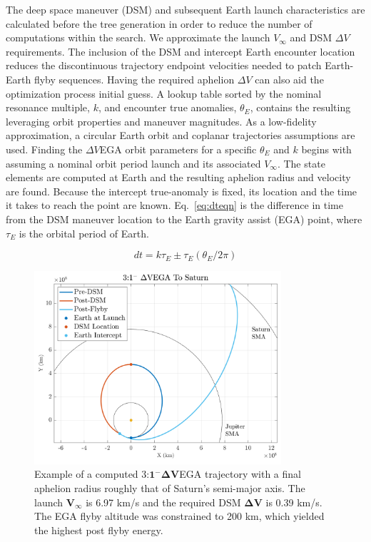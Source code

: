 \documentclass[letterpaper, paper,11pt]{AAS}	%
\begin{document}
The deep space maneuver (DSM) and subsequent Earth launch characteristics are calculated before the tree generation in order to reduce the number of computations within the search. We approximate the launch $V_\infty$ and DSM $\Delta V$ requirements. The inclusion of the DSM and intercept Earth encounter location reduces the discontinuous trajectory endpoint velocities needed to patch Earth-Earth flyby sequences. Having the required aphelion $\Delta V$ can also aid the optimization process initial guess. A lookup table sorted by the nominal resonance multiple, $k$, and encounter true anomalies, $\theta_{E}$, contains the resulting leveraging orbit properties and maneuver magnitudes. As a low-fidelity approximation, a circular Earth orbit and coplanar trajectories assumptions are used. Finding the $\Delta V$EGA orbit parameters for a specific $\theta_{E}$ and $k$ begins with assuming a nominal orbit period launch and its associated $V_\infty$. The state elements are computed at Earth and the resulting aphelion radius and velocity are found. Because the intercept true-anomaly is fixed, its location and the time it takes to reach the point are known. Eq.~\eqref{eq:dteqn} is the difference in time from the DSM maneuver location to the Earth gravity assist (EGA) point, where $\tau_E$ is the orbital period of Earth.

\begin{equation}
	\label{eq:dteqn}
	dt = k\tau_E \pm \tau_E(\theta_E/2\pi)
\end{equation}

\begin{figure}[htb]
	\centering\includegraphics[width=3.6in]{./fig/dsmmatlab}
    \caption{Example of a computed 3:$\boldsymbol{1^- \Delta V}$EGA trajectory with a final aphelion radius roughly that of Saturn's semi-major axis. The launch $\boldsymbol{V_\infty}$ is 6.97 km/s and the required DSM $\boldsymbol{\Delta V}$ is 0.39 km/s. The EGA flyby altitude was constrained to 200 km, which yielded the highest post flyby energy.}
	\label{fig:dsmmatlab}
\end{figure}
\end{document}
